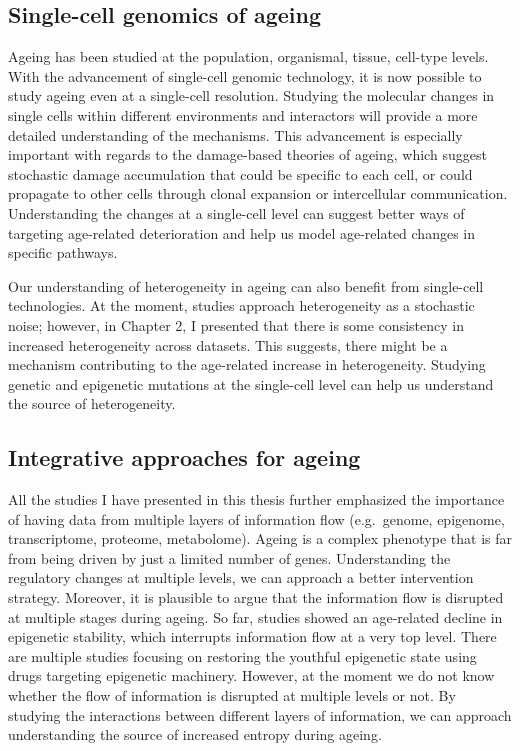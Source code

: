 \documentclass[12pt,twoside]{unicam}
\begin{document}
\hypertarget{single-cell-genomics-of-ageing}{%
\subsection{Single-cell genomics of ageing}\label{single-cell-genomics-of-ageing}}

Ageing has been studied at the population, organismal, tissue, cell-type levels. With the advancement of single-cell genomic technology, it is now possible to study ageing even at a single-cell resolution. Studying the molecular changes in single cells within different environments and interactors will provide a more detailed understanding of the mechanisms. This advancement is especially important with regards to the damage-based theories of ageing, which suggest stochastic damage accumulation that could be specific to each cell, or could propagate to other cells through clonal expansion or intercellular communication. Understanding the changes at a single-cell level can suggest better ways of targeting age-related deterioration and help us model age-related changes in specific pathways.

Our understanding of heterogeneity in ageing can also benefit from single-cell technologies. At the moment, studies approach heterogeneity as a stochastic noise; however, in Chapter 2, I presented that there is some consistency in increased heterogeneity across datasets. This suggests, there might be a mechanism contributing to the age-related increase in heterogeneity. Studying genetic and epigenetic mutations at the single-cell level can help us understand the source of heterogeneity.

\hypertarget{integrative-approaches-for-ageing}{%
\subsection{Integrative approaches for ageing}\label{integrative-approaches-for-ageing}}

All the studies I have presented in this thesis further emphasized the importance of having data from multiple layers of information flow (e.g.~genome, epigenome, transcriptome, proteome, metabolome). Ageing is a complex phenotype that is far from being driven by just a limited number of genes. Understanding the regulatory changes at multiple levels, we can approach a better intervention strategy. Moreover, it is plausible to argue that the information flow is disrupted at multiple stages during ageing. So far, studies showed an age-related decline in epigenetic stability, which interrupts information flow at a very top level. There are multiple studies focusing on restoring the youthful epigenetic state using drugs targeting epigenetic machinery. However, at the moment we do not know whether the flow of information is disrupted at multiple levels or not. By studying the interactions between different layers of information, we can approach understanding the source of increased entropy during ageing.
\end{document}
